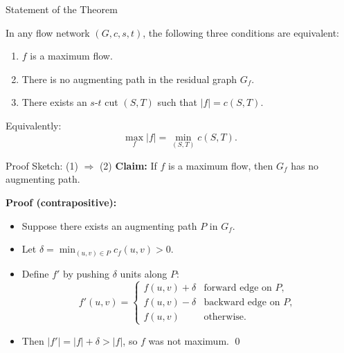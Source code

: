 \documentclass[aspectratio=169]{beamer}
\begin{document}
\begin{frame}{Statement of the Theorem}
  \begin{theorem}
    In any flow network $(G, c, s, t)$, the following three conditions are
    equivalent:
    \begin{enumerate}
      \item $f$ is a maximum flow.
      \item There is no augmenting path in the residual graph $G_f$.
      \item There exists an $s$-$t$ cut $(S, T)$ such that $|f| = c(S, T)$.
    \end{enumerate}
  \end{theorem}

  \vspace{0.5em}
  Equivalently:
  \[
    \max_f |f| = \min_{(S,T)} c(S,T).
  \]
\end{frame}

\begin{frame}{Proof Sketch: (1) $\Rightarrow$ (2)}
  \textbf{Claim:} If $f$ is a maximum flow, then $G_f$ has no augmenting path.

  \vspace{1em}
  \textbf{Proof (contrapositive):}
  \begin{itemize}
    \item Suppose there exists an augmenting path $P$ in $G_f$.
    \item Let $\delta = \min_{(u,v) \in P} c_f(u,v) > 0$.
    \item Define $f'$ by pushing $\delta$ units along $P$:
          \[
            f'(u,v) =
            \begin{cases}
              f(u,v) + \delta & \text{forward edge on } P, \\
              f(u,v) - \delta & \text{backward edge on } P, \\
              f(u,v)          & \text{otherwise.}
            \end{cases}
          \]
    \item Then $|f'| = |f| + \delta > |f|$, so $f$ was not maximum. \qed
  \end{itemize}
\end{frame}
\end{document}
